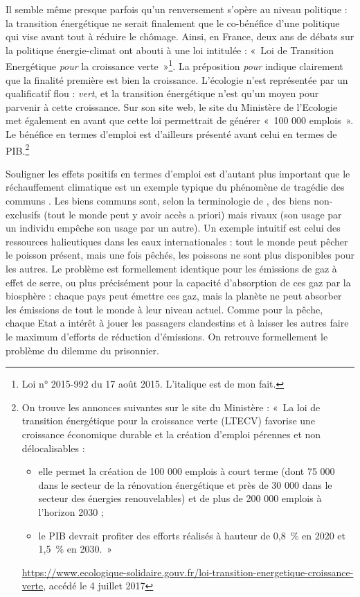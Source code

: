 Il semble même presque parfois qu’un renversement s’opère au niveau politique : la transition énergétique ne serait finalement que le co-bénéfice d’une politique qui vise avant tout à réduire le chômage. Ainsi, en France, deux ans de débats sur la politique énergie-climat ont abouti à une loi intitulée : «~Loi de Transition Energétique \textit{pour} la croissance verte~»\footnote{Loi n° 2015-992 du 17 août 2015. L'italique est de mon fait.
}. La préposition \textit{pour} indique clairement que la finalité première est bien la croissance. L'écologie n'est représentée par un qualificatif flou : \textit{vert}, et la transition énergétique n'est qu'un moyen pour parvenir à cette croissance. 
Sur son site web, le site du Ministère de l'Ecologie met également en avant que cette loi permettrait de générer «~100 000 emplois~». Le bénéfice en termes d'emploi est d'ailleurs présenté avant celui en termes de PIB.\footnote{On trouve les annonces suivantes sur le site du Ministère : «~La loi de transition énergétique pour la croissance verte (LTECV) favorise une croissance économique durable et la création d'emploi pérennes et non délocalisables :
\begin{itemize}
	\item elle permet la création de 100 000 emplois à court terme (dont 75 000 dans le secteur de la rénovation énergétique et près de 30 000 dans le secteur des énergies renouvelables) et de plus de 200 000 emplois à l’horizon 2030 ;
	\item le PIB devrait profiter des efforts réalisés à hauteur de 0,8~\% en 2020 et 1,5~\% en 2030.~»
\end{itemize}
\url{https://www.ecologique-solidaire.gouv.fr/loi-transition-energetique-croissance-verte}, accédé le 4 juillet 2017
}

Souligner les effets positifs en termes d’emploi est d’autant plus important que le réchauffement climatique est un exemple typique du phénomène de tragédie des communs \citep{Hardin1968}. Les biens communs sont, selon la terminologie de \citet{Samuelson1954}, des biens non-exclusifs (tout le monde peut y avoir accès a priori) mais rivaux (son usage par un individu empêche son usage par un autre). Un exemple intuitif est celui des ressources halieutiques dans les eaux internationales : tout le monde peut pêcher le poisson présent, mais une fois pêchés, les poissons ne sont plus disponibles pour les autres.
Le problème est formellement identique pour les émissions de gaz à effet de serre, ou plus précisément pour la capacité d'absorption de ces gaz par la biosphère : chaque pays peut émettre ces gaz, mais la planète ne peut absorber les émissions de tout le monde à leur niveau actuel.
Comme pour la pêche, chaque Etat a intérêt à jouer les passagers clandestins et à laisser les autres faire le maximum d’efforts de réduction d'émissions. On retrouve formellement le problème du dilemme du prisonnier.

